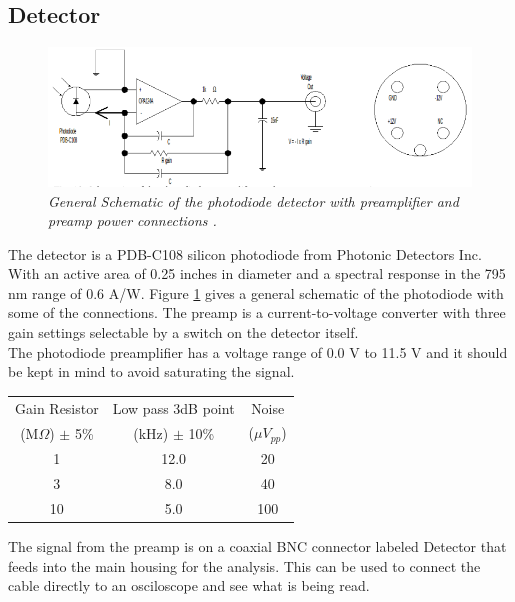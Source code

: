 \documentclass[twocolumn]{article}
\begin{document}
\subsection{Detector}
\begin{figure}
\begin{minipage}[t]{\textwidth}
\includegraphics[width=\linewidth]{pictures/detector-schem.png}
\caption{\textit{General Schematic of the photodiode detector with preamplifier 
and preamp power connections \cite{ref:3}.}}
\label{fig:14}
\end{minipage}
\end{figure}
The detector is a PDB-C108 silicon photodiode from Photonic Detectors Inc. 
\cite{ref:3} With an active area of 0.25 inches in diameter and a spectral 
response in the 795 nm range of 0.6 A/W. Figure \ref{fig:14} gives a general 
schematic of the photodiode with some of the connections. The preamp is a 
current-to-voltage converter with three gain settings selectable by a switch 
on the detector itself.
\\
The photodiode preamplifier has a voltage range of 0.0 V to 11.5 V and it 
should be kept in mind to avoid saturating the signal.
\begin{minipage}[t]{\linewidth}
\center
\begin{tabular}{|c|c|c|}
\hline
Gain Resistor & Low pass 3dB point & Noise \\ 
(M$\Omega$) $\pm$ 5\% & (kHz) $\pm$ 10\% & ($\mu V_{pp}$) \\ \hline
1 & 12.0 & 20 \\ \hline
3 & 8.0 & 40 \\ \hline
10 & 5.0 & 100 \\ \hline
\end{tabular}
\label{tbl:1}
\end{minipage}
The signal from the preamp is on a coaxial BNC connector labeled Detector that 
feeds into the main housing for the analysis. This can be used to connect 
the cable directly to an osciloscope and see what is being read.
\end{document}
